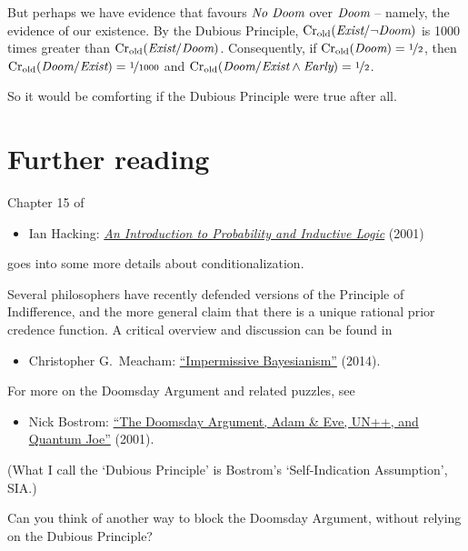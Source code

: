 But perhaps we have evidence that favours $\emph{No Doom}$
over $\emph{Doom}$ -- namely, the evidence of our existence. By the
Dubious Principle, $\text{Cr$_{\text{old}}$}(\emph{Exist}/\neg\emph{Doom})$ is 1000
times greater than $\text{Cr$_{\text{old}}$}(\emph{Exist}/\emph{Doom})$. Consequently,
if $\text{Cr$_{\text{old}}$}(\emph{Doom}) = \nicefrac{1}{2}$, then
$\text{Cr$_{\text{old}}$}(\emph{Doom}/\emph{Exist}) = \nicefrac{1}{1000}$ and
$\text{Cr$_{\text{old}}$}(\emph{Doom}/\emph{Exist} \land \emph{Early}) = \nicefrac{1}{2}$.

So it would be comforting if the Dubious Principle were true after all.



\newpage

\section{Further reading}

Chapter 15 of 
\begin{itemize}
\item Ian Hacking: \href{http://fitelson.org/confirmation/hacking_introduction_to_probability_and_inductive_logic.pdf}{\emph{An Introduction to Probability and Inductive Logic}} (2001)
\end{itemize}
goes into some more details about conditionalization. 

Several philosophers have recently defended versions of the Principle
of Indifference, and the more general claim that there is a unique
rational prior credence function. A critical overview and discussion
can be found in
\begin{itemize}
\item Christopher G.\ Meacham: \href{http://people.umass.edu/cmeacham/Meacham.Impermissive.Bayesiansim.pdf}{``Impermissive Bayesianism''} (2014).
\end{itemize}

For more on the Doomsday Argument and related puzzles, see
\begin{itemize}
\item Nick Bostrom:
  \href{http://www.anthropic-principle.com/preprints/cau/paradoxes.html}{``The
    Doomsday Argument, Adam \& Eve, UN++, and Quantum Joe''} (2001).
\end{itemize}
(What I call the `Dubious Principle' is Bostrom's `Self-Indication Assumption', SIA.)

\begin{essay}
  Can you think of another way to block the Doomsday Argument, without
  relying on the Dubious Principle?
\end{essay}

